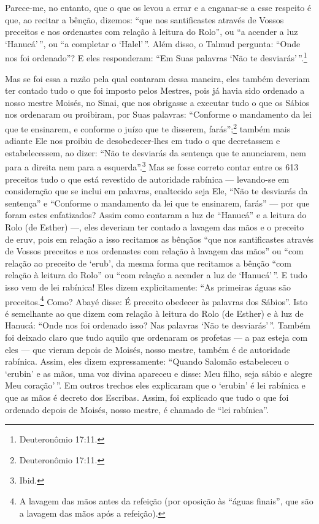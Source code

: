 Parece-me, no entanto, que o que os levou a errar e a enganar-se a esse
respeito é que, ao recitar a bênção, dizemos: ``que nos santificastes
através de Vossos preceitos e nos ordenastes com relação à leitura do
Rolo'', ou ``a acender a luz `Hanucá'\,'', ou ``a completar o `Halel'\,''.
Além disso, o Talmud pergunta: ``Onde nos foi ordenado''? E eles
responderam: ``Em Suas palavras `Não te desviarás'\,''.\footnote{Deuteronômio
17:11.}

Mas se foi essa a razão pela qual contaram dessa maneira, eles também
deveriam ter contado tudo o que foi imposto pelos Mestres, pois já havia
sido ordenado a nosso mestre Moisés, no Sinai, que nos obrigasse a
executar tudo o que os Sábios nos ordenaram ou proibiram, por Suas
palavras: ``Conforme o mandamento da lei que te ensinarem, e conforme o
juízo que te disserem, farás'';\footnote{Deuteronômio 17:11.} também mais
adiante Ele nos proibiu de desobedecer-lhes em tudo o que decretassem e
estabelecessem, ao dizer: ``Não te desviarás da sentença que te
anunciarem, nem para a direita nem para a esquerda''.\footnote{Ibid.} Mas se
fosse correto contar entre os 613 preceitos tudo o que está revestido de
autoridade rabínica --- levando-se em consideração que se inclui em
palavras, enaltecido seja Ele, ``Não te desviarás da sentença'' e
``Conforme o mandamento da lei que te ensinarem, farás'' --- por que
foram estes enfatizados? Assim como contaram a luz de ``Hanucá'' e a
leitura do Rolo (de Esther) ---, eles deveriam ter contado a lavagem das
mãos e o preceito de eruv,\starr{} pois em relação a
isso recitamos as bênçãos ``que nos santificastes
através de Vossos preceitos e nos ordenastes com relação à lavagem das
mãos'' ou ``com relação ao preceito de `erub', da mesma forma que
recitamos a bênção ``com relação à leitura do Rolo'' ou ``com relação a
acender a luz de `Hanucá'\,''. E tudo isso vem de lei rabínica! Eles
dizem explicitamente: ``As primeiras águas são
preceitos.\footnote{A lavagem das mãos antes da refeição (por oposição às ``águas
  finais'', que são a lavagem das mãos após a refeição).} Como? Abayé disse: É preceito obedecer às
palavras dos Sábios''. Isto é semelhante ao que dizem com relação à
leitura do Rolo (de Esther) e à luz de Hanucá: ``Onde nos foi ordenado
isso? Nas palavras `Não te desviarás'\,''. Também foi deixado claro que
tudo aquilo que ordenaram os profetas --- a paz esteja com eles --- que
vieram depois de Moisés, nosso mestre, também é de autoridade rabínica.
Assim, eles dizem expressamente: ``Quando Salomão estabeleceu o `erubin'
e as mãos, uma voz divina apareceu e disse: Meu
filho, seja sábio e alegre Meu coração'\,''. Em outros trechos eles
explicaram que o `erubin' é lei rabínica e que as
mãos é decreto dos Escribas. Assim, foi explicado
que tudo o que foi ordenado depois de Moisés, nosso mestre, é chamado de
``lei rabínica''.

